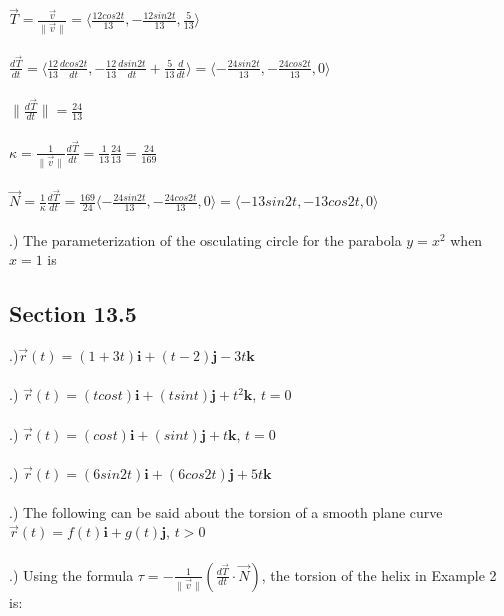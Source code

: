 \documentclass[12pt]{article}
\begin{document}
\noindent $\vec{T} = \frac{\vec{v}}{\| \vec{v} \|} = \langle \frac{12cos{2t}}{13}, -\frac{12sin{2t}}{13}, \frac{5}{13}\rangle$\\\\
\noindent $\frac{d\vec{T}}{dt} = \langle \frac{12}{13}\frac{dcos{2t}}{dt} , -\frac{12}{13}\frac{dsin{2t}}{dt} + \frac{5}{13}\frac{d}{dt}\rangle
= \langle -\frac{24sin{2t}}{13}, -\frac{24cos{2t}}{13}, 0 \rangle$\\\\
\noindent $\| \frac{d\vec{T}}{dt} \|  = \frac{24}{13}$\\\\
\noindent $\kappa = \frac{1}{\| \vec{v} \| }\frac{d\vec{T}}{dt} = \frac{1}{13}\frac{24}{13} =\frac{24}{169}$\\\\
\noindent $\vec{N} = \frac{1}{\kappa}\frac{d\vec{T}}{dt} = \frac{169}{24}\langle -\frac{24sin{2t}}{13}, -\frac{24cos{2t}}{13}, 0\rangle 
 = \langle -13sin{2t}, -13cos{2t}, 0\rangle $\\\\
.) The parameterization of the osculating circle for the parabola $y = x^{2}$ when $x = 1$ is \clearpage



\subsection*{Section 13.5}
.)$\vec{r}(t) = (1 + 3t)\mathbf{i} + (t - 2)\mathbf{j} - 3t\mathbf{k}$\\\\
.) $\vec{r}(t) = (tcos{t})\mathbf{i} + (tsin{t})\mathbf{j} + t^{2}\mathbf{k}$, \hspace{10pt} $t = 0$\\\\
.) $\vec{r}(t) = (cos{t})\mathbf{i} + (sin{t})\mathbf{j} + t\mathbf{k}$, \hspace{10pt} $t = 0$\\\\
.) $\vec{r}(t) = (6sin{2t})\mathbf{i} + (6cos{2t})\mathbf{j} + 5t\mathbf{k}$\\\\
.) The following can be said about the torsion of a smooth plane curve $\vec{r}(t) = f(t)\mathbf{i} + g(t)\mathbf{j}$, \hspace{10pt} $t > 0$\\\\
.) Using the formula $\tau = -\frac{1}{\| \vec{v} \|}(\frac{d\vec{T}}{dt} \cdot \vec{N})$, the torsion of the helix in Example 2 is:\\\\
\end{document}
